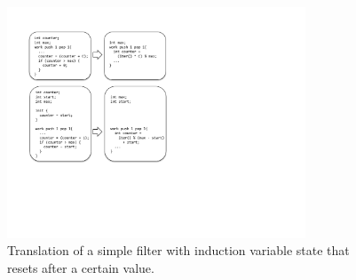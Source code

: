 %
%  
%
%
%
%
%
%    
%
%


\begin{figure}[t]
\includegraphics[width=3.5in]{figures/transformation1.pdf}
\caption{Translation of a simple filter with induction variable state that resets after a certain value. \protect\label{fig:transform-after-simple}}
\end{figure}

